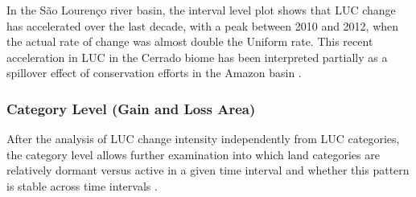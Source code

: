 In the São Lourenço river basin, the interval level plot shows that LUC change
has accelerated over the last decade, with a peak between 2010 and 2012,
when the actual rate of change was almost double the Uniform rate. This
recent acceleration in LUC in the Cerrado biome has been interpreted
partially as a spillover effect of conservation efforts in the Amazon
basin \citep{Dou2018}.

\hypertarget{category-level-gain-and-loss-area}{%
\subsubsection{Category Level (Gain and Loss
Area)}\label{category-level-gain-and-loss-area}}

After the analysis of LUC change intensity independently from LUC
categories, the category level allows further examination into which
land categories are relatively dormant versus active in a given time
interval and whether this pattern is stable across time intervals
\citep{Aldwaik2012}.

